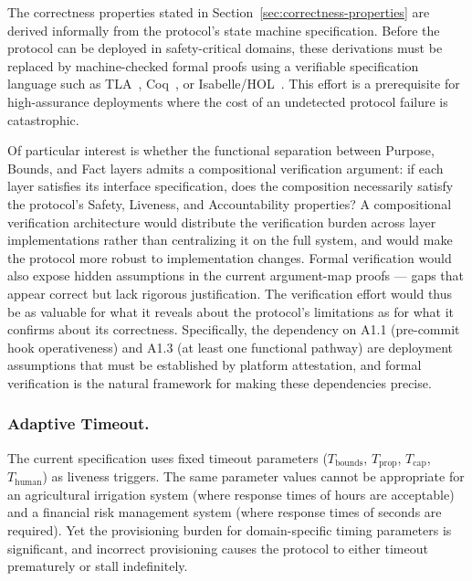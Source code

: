 The correctness properties stated in Section~\ref{sec:correctness-properties} are derived informally from the protocol's state machine specification. Before the protocol can be deployed in safety-critical domains, these derivations must be replaced by machine-checked formal proofs using a verifiable specification language such as TLA~\cite{lamport:tla}, Coq~\cite{coq:proofassistant}, or Isabelle/HOL~\cite{abelle:proofassistant}. This effort is a prerequisite for high-assurance deployments where the cost of an undetected protocol failure is catastrophic.

Of particular interest is whether the functional separation between Purpose, Bounds, and Fact layers admits a compositional verification argument: if each layer satisfies its interface specification, does the composition necessarily satisfy the protocol's Safety, Liveness, and Accountability properties? A compositional verification architecture would distribute the verification burden across layer implementations rather than centralizing it on the full system, and would make the protocol more robust to implementation changes. Formal verification would also expose hidden assumptions in the current argument-map proofs --- gaps that appear correct but lack rigorous justification. The verification effort would thus be as valuable for what it reveals about the protocol's limitations as for what it confirms about its correctness. Specifically, the dependency on A1.1 (pre-commit hook operativeness) and A1.3 (at least one functional pathway) are deployment assumptions that must be established by platform attestation, and formal verification is the natural framework for making these dependencies precise.

\subsubsection{Adaptive Timeout.}\label{sec:fw-adaptive-timeout}

The current specification uses fixed timeout parameters ($T_{\text{bounds}}$, $T_{\text{prop}}$, $T_{\text{cap}}$, $T_{\text{human}}$) as liveness triggers. The same parameter values cannot be appropriate for an agricultural irrigation system (where response times of hours are acceptable) and a financial risk management system (where response times of seconds are required). Yet the provisioning burden for domain-specific timing parameters is significant, and incorrect provisioning causes the protocol to either timeout prematurely or stall indefinitely.

